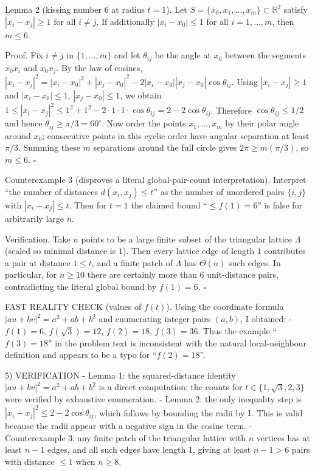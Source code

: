 Lemma 2 (kissing number $6$ at radius $t=1$).
Let $S=\{x_0,x_1,\ldots,x_m\}\subset\mathbb{R}^2$ satisfy $|x_i-x_j|\ge 1$ for all $i\neq j$.
If additionally $|x_i-x_0|\le 1$ for all $i=1,\ldots,m$, then $m\le 6$.

Proof.
Fix $i\neq j$ in $\{1,\ldots,m\}$ and let $\theta_{ij}$ be the angle at $x_0$ between the segments $x_0x_i$ and $x_0x_j$.
By the law of cosines,
$|x_i-x_j|^2 = |x_i-x_0|^2 + |x_j-x_0|^2 -2|x_i-x_0||x_j-x_0|\cos\theta_{ij}$.
Using $|x_i-x_j|\ge 1$ and $|x_i-x_0|\le 1$, $|x_j-x_0|\le 1$, we obtain
$1 \le |x_i-x_j|^2 \le 1^2+1^2 - 2\cdot 1\cdot 1\cdot \cos\theta_{ij} = 2-2\cos\theta_{ij}$.
Therefore $\cos\theta_{ij}\le 1/2$ and hence $\theta_{ij}\ge \pi/3=60^\circ$.
Now order the points $x_1,\ldots,x_m$ by their polar angle around $x_0$; consecutive points in this cyclic order have angular separation at least $\pi/3$.
Summing these $m$ separations around the full circle gives $2\pi \ge m(\pi/3)$, so $m\le 6$. $\square$

Counterexample 3 (disproves a literal global-pair-count interpretation).
Interpret ``the number of distances $d(x_i,x_j)\le t$'' as the number of unordered pairs $\{i,j\}$ with $|x_i-x_j|\le t$.
Then for $t=1$ the claimed bound ``$\le f(1)=6$'' is false for arbitrarily large $n$.

Verification.
Take $n$ points to be a large finite subset of the triangular lattice $\Lambda$ (scaled so minimal distance is $1$).
Then every lattice edge of length $1$ contributes a pair at distance $1\le t$, and a finite patch of $\Lambda$ has $\Theta(n)$ such edges.
In particular, for $n\ge 10$ there are certainly more than $6$ unit-distance pairs, contradicting the literal global bound by $f(1)=6$. $\square$

FAST REALITY CHECK (values of $f(t)$).
Using the coordinate formula $|a u+b v|^2=a^2+ab+b^2$ and enumerating integer pairs $(a,b)$, I obtained:
- $f(1)=6$, $f(\sqrt3)=12$, $f(2)=18$, $f(3)=36$.
Thus the example ``$f(3)=18$'' in the problem text is inconsistent with the natural local-neighbour definition and appears to be a typo for ``$f(2)=18$''.

5) VERIFICATION
- Lemma 1: the squared-distance identity $|a u+b v|^2=a^2+ab+b^2$ is a direct computation; the counts for $t\in\{1,\sqrt3,2,3\}$ were verified by exhaustive enumeration.
- Lemma 2: the only inequality step is $|x_i-x_j|^2\le 2-2\cos\theta_{ij}$, which follows by bounding the radii by $1$. This is valid because the radii appear with a negative sign in the cosine term.
- Counterexample 3: any finite patch of the triangular lattice with $n$ vertices has at least $n-1$ edges, and all such edges have length $1$, giving at least $n-1>6$ pairs with distance $\le 1$ when $n\ge 8$.

